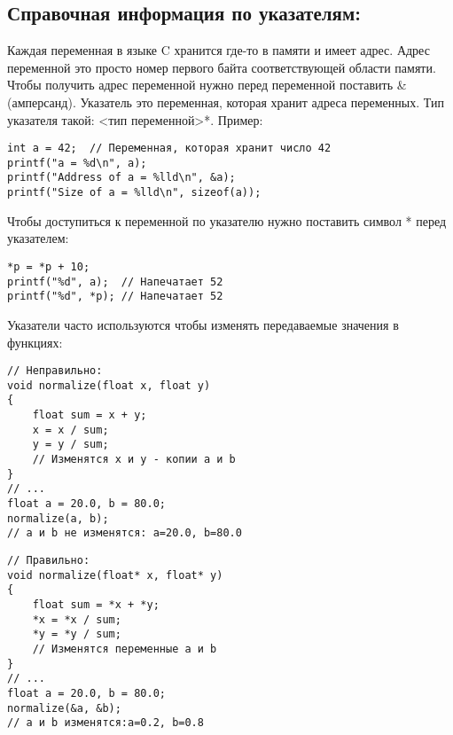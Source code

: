 \documentclass{article}
\begin{document}

\newpage
\subsection*{Справочная информация по указателям:}
Каждая переменная в языке C хранится где-то в памяти и имеет адрес. Адрес переменной это просто номер первого байта соответствующей области памяти. Чтобы получить адрес переменной нужно перед переменной поставить \&(амперсанд).
Указатель это переменная, которая хранит адреса переменных. Тип указателя такой: <тип переменной>*. Пример:
\begin{verbatim}
int a = 42;  // Переменная, которая хранит число 42
printf("a = %d\n", a);
printf("Address of a = %lld\n", &a);
printf("Size of a = %lld\n", sizeof(a));
\end{verbatim}
Чтобы доступиться к переменной по указателю нужно поставить символ * перед указателем:
\begin{verbatim}
*p = *p + 10;
printf("%d", a);  // Напечатает 52
printf("%d", *p); // Напечатает 52
\end{verbatim}
Указатели часто используются чтобы изменять передаваемые значения в функциях:
\begin{multicols}{2}
\begin{verbatim}
// Неправильно:
void normalize(float x, float y)
{
    float sum = x + y;
    x = x / sum;
    y = y / sum; 
    // Изменятся x и y - копии a и b
}
// ...
float a = 20.0, b = 80.0;
normalize(a, b);
// a и b не изменятся: a=20.0, b=80.0
\end{verbatim}
\begin{verbatim}
// Правильно:
void normalize(float* x, float* y)
{
    float sum = *x + *y;
    *x = *x / sum;
    *y = *y / sum; 
    // Изменятся переменные a и b
}
// ...
float a = 20.0, b = 80.0;
normalize(&a, &b);
// a и b изменятся:a=0.2, b=0.8
\end{verbatim}
\end{multicols}
\end{document}
